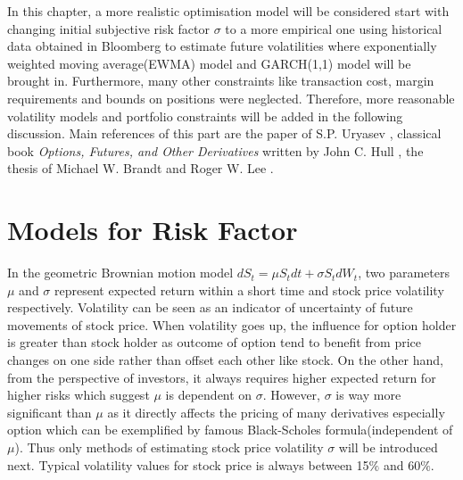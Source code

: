 In this chapter, a more realistic optimisation model will be considered start with changing initial subjective risk factor $\sigma$ to a more empirical one using historical data obtained in Bloomberg to estimate future volatilities where exponentially weighted moving average(EWMA) model and GARCH(1,1) model will be brought in. Furthermore, many other constraints like transaction cost, margin requirements and bounds on positions were neglected. Therefore, more reasonable volatility models and portfolio constraints will be added in the following discussion. Main references of this part are the paper of S.P. Uryasev \cite{10}, classical book \textit{Options, Futures, and Other Derivatives} written by John C. Hull \cite{12}, the thesis of Michael W. Brandt \cite{13} and Roger W. Lee \cite{14}.
\section{Models for Risk Factor}
In the geometric Brownian motion model $dS_t=\mu S_tdt+\sigma S_tdW_t$, two parameters $\mu$ and $\sigma$ represent expected return within a short time and stock price volatility respectively. Volatility can be seen as an indicator of uncertainty of future movements of stock price.  When volatility goes up, the influence for option holder is greater than stock holder as outcome of option tend to benefit from price changes on one side rather than offset each other like stock.
On the other hand, from the perspective of investors, it always requires higher expected return for higher risks which suggest $\mu$ is dependent on $\sigma$. However, $\sigma$ is way more significant than $\mu$ as it directly affects the pricing of many derivatives especially option which can be exemplified by famous Black-Scholes formula(independent of $\mu$). Thus only methods of estimating stock price volatility $\sigma$ will be introduced next. Typical volatility values for stock price is always between 15$\%$ and 60$\%$. 
